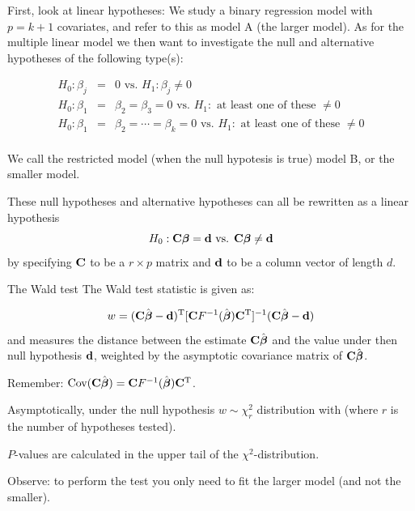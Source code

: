 \documentclass[
  ignorenonframetext,
]{beamer}
\begin{document}
\begin{frame}
First, look at linear hypotheses: We study a binary regression model
with \(p=k+1\) covariates, and refer to this as model A (the larger
model). As for the multiple linear model we then want to investigate the
null and alternative hypotheses of the following type(s):

\begin{eqnarray*}
 H_0: \beta_{j}&=&0 \text{ vs. } H_1:\beta_j\neq 0\\
 H_0: \beta_{1}&=&\beta_{2}=\beta_{3}=0 \text{ vs. } H_1:\text{ at least one of these }\neq 0\\
 H_0: \beta_{1}&=&\beta_{2}=\cdots=\beta_{k}=0 \text{ vs. } H_1:\text{ at least one of these }\neq 0\\
 \end{eqnarray*}
\end{frame}

\begin{frame}
We call the restricted model (when the null hypotesis is true) model B,
or the smaller model.

These null hypotheses and alternative hypotheses can all be rewritten as
a linear hypothesis
\[H_0: {\bf C}{\bf \boldsymbol{\beta}}={\bf d} \text{ vs. } {\bf C}{\bf \boldsymbol{\beta}}\neq {\bf d} \]
by specifying \({\bf C}\) to be a \(r \times p\) matrix and \({\bf d}\)
to be a column vector of length \(d\).
\end{frame}

\begin{frame}
\begin{block}{The Wald test}
\protect\hypertarget{the-wald-test}{}
The Wald test statistic is given as:

\[
w=({\bf C}\hat{{\bf \boldsymbol{\beta}}}-{\bf d})^{\text T}[{\bf C}F^{-1}(\hat{\boldsymbol{\beta}}){\bf C}^{\text T}]^{-1}({\bf C}\hat{{\bf \boldsymbol{\beta}}}-{\bf d})
\] and measures the distance between the estimate
\({\bf C}\hat{\boldsymbol{\beta}}\) and the value under then null
hypothesis \({\bf d}\), weighted by the asymptotic covariance matrix of
\({\bf C}\hat{\boldsymbol{\beta}}\).

Remember:
\(\text{Cov}({\bf C}\hat{\boldsymbol{\beta}})={\bf C}F^{-1}(\hat{\boldsymbol{\beta}}){\bf C}^{\text T}\).

Asymptotically, under the null hypothesis \(w \sim \chi_r^2\)
distribution with (where \(r\) is the number of hypotheses tested).

\(P\)-values are calculated in the upper tail of the
\(\chi^2\)-distribution.

Observe: to perform the test you only need to fit the larger model (and
not the smaller).
\end{block}
\end{frame}
\end{document}
